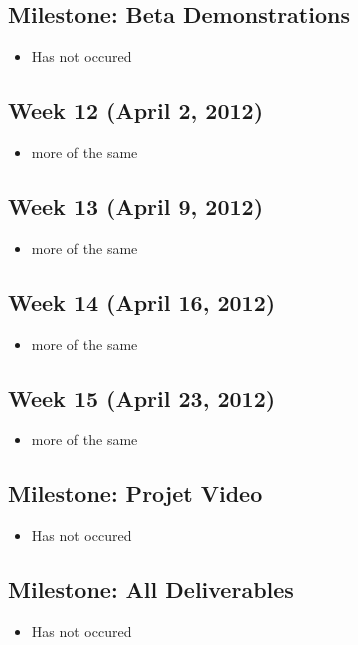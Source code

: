 \documentclass[11pt,a4paper,oneside]{article}
\begin{document}
\subsection{Milestone: Beta Demonstrations}
\begin{itemize}
\item Has not occured
\end{itemize}

\subsection{Week 12 (April 2, 2012)}
\begin{itemize}
\item more of the same
\end{itemize}

\subsection{Week 13 (April 9, 2012)}
\begin{itemize}
\item more of the same
\end{itemize}

\subsection{Week 14 (April 16, 2012)}
\begin{itemize}
\item more of the same
\end{itemize}

\subsection{Week 15 (April 23, 2012)}
\begin{itemize}
\item more of the same
\end{itemize}

\subsection{Milestone: Projet Video}
\begin{itemize}
\item Has not occured
\end{itemize}

\subsection{Milestone: All Deliverables}
\begin{itemize}
\item Has not occured
\end{itemize}
\end{document}
